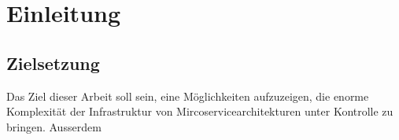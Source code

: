 %

\chapter{Einleitung}


\section{Zielsetzung}

Das Ziel dieser Arbeit soll sein, eine Möglichkeiten aufzuzeigen, die enorme Komplexität der Infrastruktur von Mircoservicearchitekturen unter Kontrolle zu bringen. Ausserdem 


